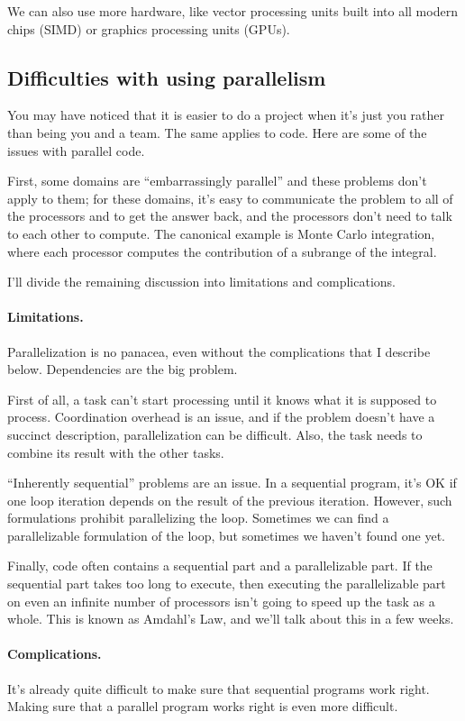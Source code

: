 We can also use more hardware, like vector processing units built into all modern
chips (SIMD) or graphics processing units (GPUs).

\subsection*{Difficulties with using parallelism}
You may have noticed that it is easier to do a project when it's just
you rather than being you and a team. The same applies to code.
Here are some of the issues with parallel code.

First, some domains are ``embarrassingly parallel'' and these problems
don't apply to them; for these domains, it's easy to communicate
the problem to all of the processors and to get the answer back, and
the processors don't need to talk to each other to compute. The canonical
example is Monte Carlo integration, where each processor computes the
contribution of a subrange of the integral.

I'll divide the remaining discussion into limitations and complications.

\paragraph{Limitations.} Parallelization is no panacea, even without
the complications that I describe below. Dependencies are the
big problem.

First of all, a task can't start processing until it knows what it
is supposed to process. Coordination overhead is an issue, and if the
problem doesn't have a succinct description, parallelization can be
difficult. Also, the task needs to combine its result with the other
tasks.

``Inherently sequential'' problems are an issue. In a sequential 
program, it's OK if one loop iteration depends on the result of the
previous iteration. However, such formulations prohibit parallelizing
the loop. Sometimes we can find a parallelizable formulation of the loop,
but sometimes we haven't found one yet.

Finally, code often contains a sequential part and a parallelizable
part. If the sequential part takes too long to execute, then
executing the parallelizable part on even an infinite number of
processors isn't going to speed up the task as a whole. This is
known as Amdahl's Law, and we'll talk about this in a few weeks.

\paragraph{Complications.} It's already quite difficult to make sure that
sequential programs work right. Making sure that a parallel program
works right is even more difficult.

